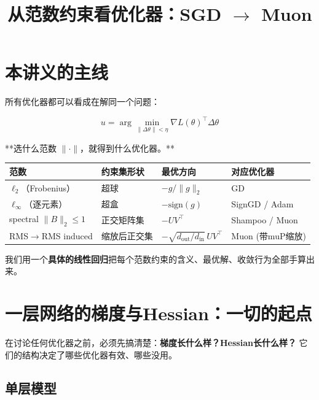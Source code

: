 \documentclass[12pt,a4paper]{article}
\title{\LARGE 从范数约束看优化器：SGD $\to$ Muon \\[6pt] \large}
\date{}
\begin{document}
\maketitle
\tableofcontents
\newpage
\setcounter{section}{-1}






\section{本讲义的主线}

所有优化器都可以看成在解同一个问题：


\[u = \arg\min_{\|\Delta\theta\| < \eta} \nabla L(\theta)^\top \Delta\theta\]

**选什么范数 $\|\cdot\|$，就得到什么优化器。**







\begin{center}\small
\begin{longtable}{|l|l|l|l|}
\hline
范数 & 约束集形状 & 最优方向 & 对应优化器 \\
\hline
$\ell_2$（Frobenius） & 超球 & $-g/\|g\|_2$ & GD \\
$\ell_\infty$（逐元素） & 超盒 & $-\text{sign}(g)$ & SignGD / Adam \\
spectral $\|B\|_2 \le 1$ & 正交矩阵集 & $-UV^\top$ & Shampoo / Muon \\
RMS$\to$RMS induced & 缩放后正交集 & $-\sqrt{d_{\text{out}}/d_{\text{in}}}\,UV^\top$ & Muon (带muP缩放) \\
\hline
\end{longtable}
\end{center}


我们用一个\textbf{具体的线性回归}把每个范数约束的含义、最优解、收敛行为全部手算出来。





\section{一层网络的梯度与Hessian：一切的起点}

在讨论任何优化器之前，必须先搞清楚：\textbf{梯度长什么样？Hessian长什么样？} 它们的结构决定了哪些优化器有效、哪些没用。


\subsection{单层模型}
\end{document}
